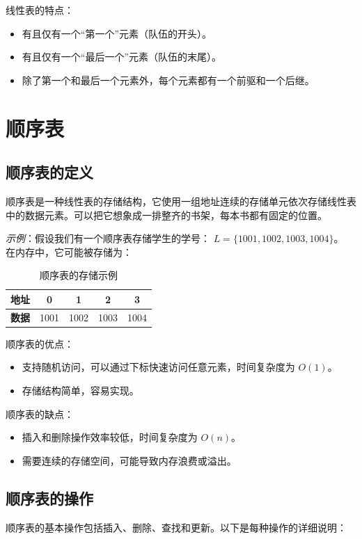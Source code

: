 \documentclass[lang=cn,newtx,10pt,scheme=chinese]{../elegantbook}
\begin{document}
线性表的特点：
\begin{itemize}
    \item 有且仅有一个“第一个”元素（队伍的开头）。
    \item 有且仅有一个“最后一个”元素（队伍的末尾）。
    \item 除了第一个和最后一个元素外，每个元素都有一个前驱和一个后继。
\end{itemize}

\section{顺序表}

\subsection{顺序表的定义}
顺序表是一种线性表的存储结构，它使用一组地址连续的存储单元依次存储线性表中的数据元素。可以把它想象成一排整齐的书架，每本书都有固定的位置。

\textit{示例}：假设我们有一个顺序表存储学生的学号：
$L = \{1001, 1002, 1003, 1004\}$。
在内存中，它可能被存储为：
\begin{table}[!htbp]
  \centering
  \begin{tabular}{|c|c|c|c|c|}
  \hline
  \textbf{地址} & 0 & 1 & 2 & 3 \\
  \hline
  \textbf{数据} & 1001 & 1002 & 1003 & 1004 \\
  \hline
  \end{tabular}
  \caption{顺序表的存储示例}
\label{tab:sequence_table}
\end{table}
顺序表的优点：
\begin{itemize}
    \item 支持随机访问，可以通过下标快速访问任意元素，时间复杂度为 $O(1)$。
    \item 存储结构简单，容易实现。
\end{itemize}

顺序表的缺点：
\begin{itemize}
    \item 插入和删除操作效率较低，时间复杂度为 $O(n)$。
    \item 需要连续的存储空间，可能导致内存浪费或溢出。
\end{itemize}

\subsection{顺序表的操作}
顺序表的基本操作包括插入、删除、查找和更新。以下是每种操作的详细说明：
\end{document}
